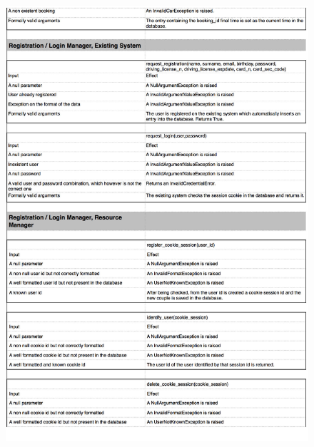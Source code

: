\documentclass[a4paper,10pt]{article}
\begin{document}
    \begin{figure}[!h]
  \centering
    \includegraphics[scale=0.26]{Resources/2.jpg}
  \end{figure}
\end{document}
